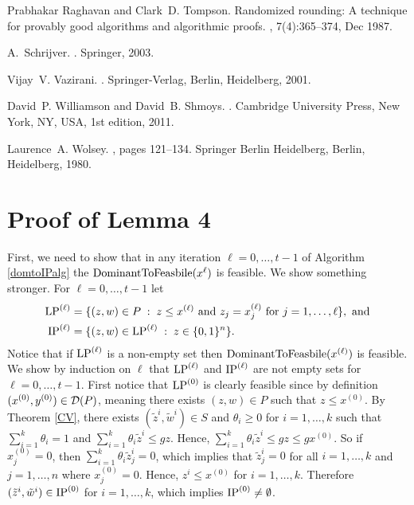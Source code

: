 \documentclass[runningheads]{llncs}
\begin{document}
\begin{thebibliography}{10}
	Prabhakar Raghavan and Clark~D. Tompson.
	\newblock Randomized rounding: A technique for provably good algorithms and
	algorithmic proofs.
	, 7(4):365--374, Dec 1987.
	
	A.~Schrijver.
	.
	\newblock Springer, 2003.
	
	Vijay~V. Vazirani.
	.
	\newblock Springer-Verlag, Berlin, Heidelberg, 2001.
	
	David~P. Williamson and David~B. Shmoys.
	.
	\newblock Cambridge University Press, New York, NY, USA, 1st edition, 2011.
	
	Laurence~A. Wolsey.
	,
	pages 121--134.
	\newblock Springer Berlin Heidelberg, Berlin, Heidelberg, 1980.
	
\end{thebibliography}

\appendix
\section{Proof of Lemma 4}\label{lemma4}
	First, we need to show that in any iteration $\ell=  0,\ldots,t-1$ of Algorithm \ref{domtoIPalg} the $\operatorname{DominantToFeasbile}(x^{\ell})$ is feasible. We show something stronger. For $\ell=0,\ldots,t-1$ let
	\begin{align*}
	\operatorname{LP}^{(\ell)}&= \{(z,w)\in P\; : \; z\leq x^{(\ell)} \mbox{ and } z_j=x_j^{(\ell)} \mbox{ for } j=1,\ldots,\ell\}, \text{ and}\\
	\operatorname{IP}^{(\ell)}&= \{(z,w)\in \operatorname{LP}^{(\ell)}\; : \; z\in \{0,1\}^n\}.
	\end{align*}
	Notice that if $\operatorname{LP}^{(\ell)}$ is a non-empty set then $\operatorname{DominantToFeasbile}(x^{(\ell)})$ is feasible. We show by induction on $\ell$ that $\operatorname{LP}^{(\ell)}$ and $\operatorname{IP}^{(\ell)}$ are not empty sets for $\ell=0,\ldots,t-1$. First notice that $\operatorname{LP}^{(0)}$ is clearly feasible since by definition $(x^{(0)},y^{(0)})\in \operatorname{\mathcal{D}}(P)$, meaning there exists $(z,w)\in P$ such that $z\leq x^{(0)}$. By Theorem \ref{CV}, there exists $(\tilde{z}^i,\tilde{w}^i) \in S$ and $\theta_i\geq 0$ for $i=1,\ldots,k$ such that $\sum_{i=1}^{k} \theta_i = 1$ and $\sum_{i=1}^{k}\theta_i \tilde{z}^i \leq gz$. Hence, $\sum_{i=1}^{k}\theta_i \tilde{z}^i \leq gz\leq gx^{(0)}$. So if $x^{(0)}_j=0$, then $ \sum_{i=1}^{k}\theta_i \tilde{z}_j^i =0$, which implies that $\tilde{z}^i_j=0$ for all $i=1,\ldots,k$ and $j= 1,\ldots,n$ where $x^{(0)}_j=0$. Hence, $z^i\leq x^{(0)}$ for $i=1,\ldots,k$. Therefore $(\tilde{z}^i,\tilde{w}^i)\in \operatorname{IP}^{(0)}$ for $i=1,\ldots,k$, which implies $\operatorname{IP}^{(0)}\neq \emptyset$.
	
\end{document}
